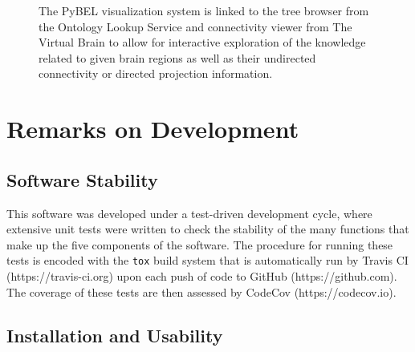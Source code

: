 \begin{figure}
\captionsetup{format=plain}
\caption[PyBEL Integration with The Virtual Brain]{The PyBEL visualization system is linked to the tree browser from the Ontology Lookup Service \cite{Cote2006} and connectivity viewer from The Virtual Brain \cite{Leon2013} to allow for interactive exploration of the knowledge related to given brain regions as well as their undirected connectivity or directed projection information.}
\label{Fig:integration_tvb}
\end{figure}

\section{Remarks on Development}

\subsection{Software Stability}

This software was developed under a test-driven development cycle, where extensive unit tests were written to check the stability of the many functions that make up the five components of the software. The procedure for running these tests is encoded with the \verb|tox| build system that is automatically run by Travis \ac{CI} (https://travis-ci.org) upon each push of code to GitHub (https://github.com). The coverage of these tests are then assessed by CodeCov (https://codecov.io).

\subsection{Installation and Usability}

